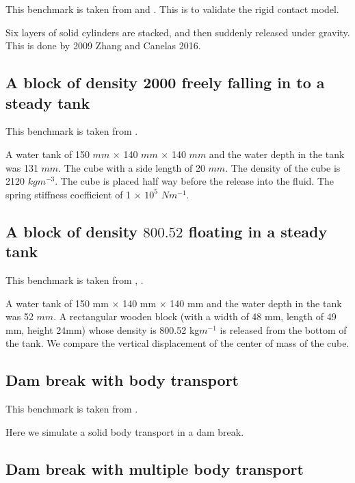 \documentclass[preprint,12pt]{elsarticle}
\begin{document}
This benchmark is taken from \citet{chen2019coupled} and
\citet{wang2019numerical}. This is to validate the rigid contact model.

Six layers of solid cylinders are stacked, and then suddenly released under
gravity. This is done by 2009 Zhang and Canelas 2016.


\subsection{A block of density 2000 freely falling in to a steady tank}
\label{sec:2000-density-inside-tank}

This benchmark is taken from \citet{qiu20173d}.

A water tank of 150 $mm$ $\times$ 140 $mm$ $\times$ 140 $mm$ and the water
depth in the tank was 131 $mm$. The cube with a side length of 20 $mm$. The
density of the cube is 2120 $kg m^{-3}$. The cube is placed half way before
the release into the fluid. The spring stiffness coefficient of 1 $\times$
$10^{5}$ $N m^{-1}$.


\subsection{A block of density $800.52$ floating in a steady tank}
\label{sec:800-density-floating}

This benchmark is taken from \citet{qiu20173d}, \citet{wang2019numerical}.

A water tank of 150 mm $\times$ 140 mm $\times$ 140 mm and the water depth in
the tank was 52 $mm$. A rectangular wooden block (with a width of 48 mm,
length of 49 mm, height 24mm) whose density is 800.52 kg$m^{-1}$ is
released from the bottom of the tank. We compare the vertical displacement of
the center of mass of the cube.


\subsection{Dam break with body transport}
\label{sec:dam-break-with-body-transport}

This benchmark is taken from \citet{wang2019numerical}.

Here we simulate a solid body transport in a dam break.


\subsection{Dam break with multiple body transport}
\label{sec:dam-break-with-multiple-body-transport}
\end{document}
